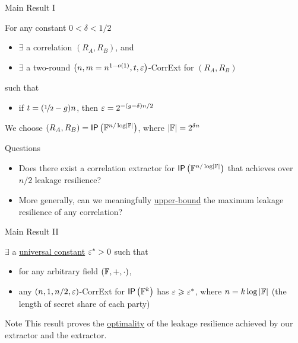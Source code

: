 \begin{frame}{Main Result I}
	\begin{theorem}
	\label{thm:construction}
	For any constant $0<\delta<1/2$
	\begin{itemize}
		\item $ \exists $ a correlation $(R_A,R_B)$, and
		\item $ \exists $ a two-round $\left(n,m = n^{1-o(1)},t,\varepsilon\right)$-CorrExt for $(R_A,R_B)$
	\end{itemize}
	such that 
	\begin{itemize}
		\item if $t=(\nicefrac12-g)n$, then $\varepsilon=2^{-(g-\delta)n/2}$
	\end{itemize} 
	\end{theorem}
	\pause
	We choose $ (R_A, R_B) = \IP[\bbF^{n/ \log \abs \bbF}] $, where $ \left\vert{\ensuremath{{\mathbb F}}}\right\vert = 2^{\delta n} $
	\pause 
	{
	\begin{block}{Questions}
		\begin{itemize}
		\item Does there exist a correlation extractor for $ \IP[\bbF^{n/ \log \abs \bbF}] $ that achieves over $ n/2 $ leakage resilience? \pause
		\item More generally, can we meaningfully \underline{upper-bound} the maximum leakage resilience of any correlation? 
		\end{itemize}
	\end{block}
	}
\end{frame}



\begin{frame}{Main Result II}
	\begin{theorem}
	\label{thm:hardness} 
	$ \exists $ a \underline{universal constant} $\varepsilon^*>0$ such that
	\begin{itemize}
		\item for any arbitrary field $({\mathbb F},+,\cdot)$,
		\item any $(n,1,%
		n/2,\eps)$-CorrExt for $ \IP [\bbF^k] $ has $\varepsilon\geqslant\varepsilon^*$, where $n=k\log\left\vert{\ensuremath{{\mathbb F}}}\right\vert$ (the length of secret share of each party)  
	\end{itemize}
\end{theorem}

{
\begin{block}{Note}
	This result proves the \underline{optimality} of the leakage resilience achieved by our extractor and the \cite{C:GIMS15} extractor.
\end{block}}

\end{frame}